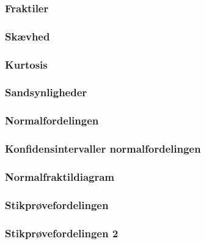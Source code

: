 \documentclass[]{book}
\begin{document}
\hypertarget{fraktiler}{%
\subsubsection{Fraktiler}\label{fraktiler}}

\hypertarget{skvhed}{%
\subsubsection{Skævhed}\label{skvhed}}

\hypertarget{kurtosis}{%
\subsubsection{Kurtosis}\label{kurtosis}}

\hypertarget{sandsynligheder}{%
\subsubsection{Sandsynligheder}\label{sandsynligheder}}

\hypertarget{normalfordelingen}{%
\subsubsection{Normalfordelingen}\label{normalfordelingen}}

\hypertarget{konfidensintervaller-normalfordelingen}{%
\subsubsection{Konfidensintervaller
normalfordelingen}\label{konfidensintervaller-normalfordelingen}}

\hypertarget{normalfraktildiagram}{%
\subsubsection{Normalfraktildiagram}\label{normalfraktildiagram}}

\hypertarget{stikprvefordelingen}{%
\subsubsection{Stikprøvefordelingen}\label{stikprvefordelingen}}

\hypertarget{stikprvefordelingen-2}{%
\subsubsection{Stikprøvefordelingen 2}\label{stikprvefordelingen-2}}
\end{document}
